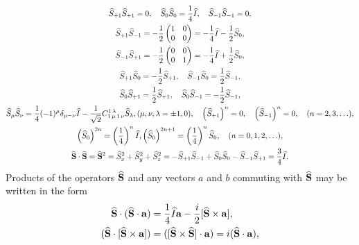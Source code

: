 \begin{gather}
\widehat{S}_{+1} \widehat{S}_{+1}=0, \quad \widehat{S}_{0} \widehat{S}_{0}=\frac{1}{4} \widehat{I}, \quad \widehat{S}_{-1} \widehat{S}_{-1}=0  ,\notag\\
\widehat{S}_{+1} \widehat{S}_{-1}=-\frac{1}{2}\begin{pmatrix}
1 & 0 \\
0 & 0
\end{pmatrix}=-\frac{1}{4} \widehat{I}-\frac{1}{2} \widehat{S}_{0} , \notag\\
\widehat{S}_{-1} \widehat{S}_{+1}=-\frac{1}{2}\begin{pmatrix}
0 & 0 \\
0 & 1
\end{pmatrix}=-\frac{1}{4} \widehat{I}+\frac{1}{2} \widehat{S}_{0} , \label{eq:2:5:15}\\
\widehat{S}_{+1} \widehat{S}_{0}=-\frac{1}{2} \widehat{S}_{+1}, \quad \widehat{S}_{-1} \widehat{S}_{0}=\frac{1}{2} \widehat{S}_{-1}  ,\notag\\
\widehat{S}_{0} \widehat{S}_{+1}=\frac{1}{2} \widehat{S}_{+1}, \quad \widehat{S}_{0} \widehat{S}_{-1}=-\frac{1}{2} \widehat{S}_{-1}  ,\notag\\
\widehat{S}_{\mu} \widehat{S}_{\nu}=\frac{1}{4}(-1)^{\mu} \delta_{\mu-\nu} \widehat{I}-\frac{1}{\sqrt{2}} C_{1\,\mu\,1\,\nu}^{1\,\lambda} \widehat{S}_{\lambda},(\mu, \nu, \lambda= \pm 1,0), \quad\left(\widehat{S}_{+1}\right)^{n}=0, \quad\left(\widehat{S}_{-1}\right)^{n}=0, \quad(n=2,3, \ldots),  \label{eq:2:5:16}\\
\left(\widehat{S}_{0}\right)^{2 n}=\left(\frac{1}{4}\right)^{n} \widehat{I},\left(\widehat{S}_{0}\right)^{2 n+1}=\left(\frac{1}{4}\right)^{n} \widehat{S}_{0}, \quad(n=0,1,2, \ldots),  \label{eq:2:5:17}\\
\widehat{\mathbf{S}} \cdot \widehat{\mathbf{S}}=\widehat{\mathbf{S}}^{2}=\widehat{S}_{x}^{2}+\widehat{S}_{y}^{2}+\widehat{S}_{z}^{2}=-\widehat{S}_{+1} \widehat{S}_{-1}+\widehat{S}_{0} \widehat{S}_{0}-\widehat{S}_{-1} \widehat{S}_{+1}=\frac{3}{4} \widehat{I}. \label{eq:2:5:18}
\end{gather}
Products of the operators $\widehat{\mathbf{S}}$ and any vectors $a$ and $b$ commuting with $\widehat{\mathbf{S}}$ may be written in the form
\begin{align}
\widehat{\mathbf{S}} \cdot(\widehat{\mathbf{S}} \cdot \mathbf{a}) & =\frac{1}{4} \widehat{I} \mathbf{a}-\frac{i}{2}[\widehat{\mathbf{S}} \times \mathbf{a}],  \label{eq:2:5:19}\\
(\widehat{\mathbf{S}} \cdot[\widehat{\mathbf{S}} \times \mathbf{a}]) & =([\widehat{\mathbf{S}} \times \widehat{\mathbf{S}}] \cdot \mathbf{a})=i(\widehat{\mathbf{S}} \cdot \mathbf{a}), \label{eq:2:5:20}
\end{align}
